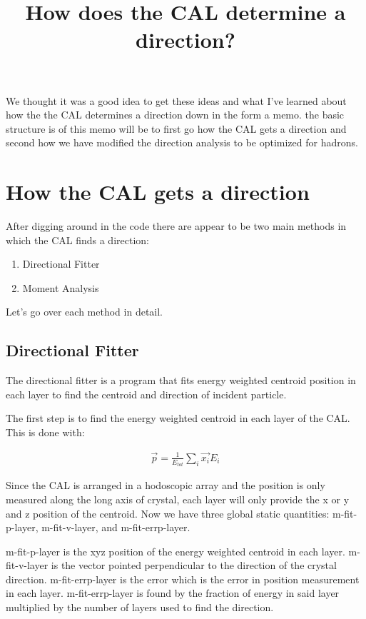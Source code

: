 \documentclass[11pt]{article}
\begin{document}
\title{How does the CAL determine a direction?}
\author{}
\date{}
\maketitle

We thought it was a good idea to get these ideas and what I've learned about how the the CAL determines a direction down in the form a memo.  the basic structure is of this memo will be to first go how the CAL gets a direction and second how we have modified the direction analysis to be optimized for hadrons.  

\section{How the CAL gets a direction}
After digging around in the code there are appear to be two main methods in which the CAL finds a direction:
\begin{enumerate}
\item Directional Fitter
\item Moment Analysis
\end{enumerate}

Let's go over each method in detail.  

\subsection{Directional Fitter}

The directional fitter is a program that fits energy weighted centroid position in each layer to find the centroid and direction of incident particle.  

The first step is to find the energy weighted centroid in each layer of the CAL.  This is done with:

\begin{eqnarray}
\vec{p} = \frac{1}{E_{{tot}}} \sum_{i} \vec{x_i} E_i
\end{eqnarray}

Since the CAL is arranged in a hodoscopic array and the position is only measured along the long axis of crystal, each layer will only provide the x or y and z position of the centroid.  Now we have three global static quantities: m-fit-p-layer, m-fit-v-layer, and m-fit-errp-layer.  

m-fit-p-layer is the xyz position of the energy weighted centroid in each layer.  m-fit-v-layer is the vector pointed perpendicular to the direction of the crystal direction.  m-fit-errp-layer is the error which is the error in position measurement in each layer.  m-fit-errp-layer is found by the fraction of energy in said layer multiplied by the number of layers used to find the direction.  
\end{document}
